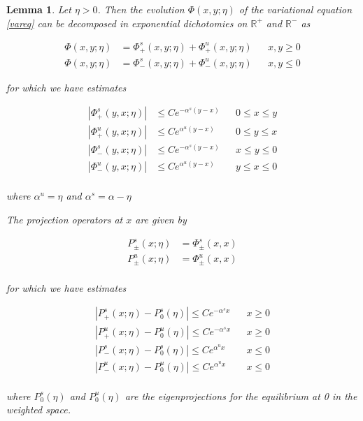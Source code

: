 \documentclass[12pt]{article}
\def\R{{\mathbb R}}
\newtheorem{lemma}{Lemma}
\begin{document}
\begin{lemma}\label{dichotomy}
Let $\eta > 0$. Then the evolution $\Phi(x, y; \eta)$ of the variational equation \eqref{vareq} can be decomposed in exponential dichotomies on $\R^+$ and $\R^-$ as

\begin{align*}
\Phi(x, y; \eta) &= \Phi^s_+(x, y; \eta) + \Phi^u_+(x, y; \eta) && x, y \geq 0 \\
\Phi(x, y; \eta) &= \Phi^s_-(x, y; \eta) + \Phi^u_-(x, y; \eta) && x, y \leq 0 
\end{align*}

for which we have estimates

\begin{align*}
|\Phi^s_+(y,x; \eta)| &\leq Ce^{-\alpha^s(y-x)} && 0 \leq x \leq y \\
|\Phi^u_+(y,x; \eta)| &\leq Ce^{\alpha^u(y-x)}  && 0 \leq y \leq x \\
|\Phi^s_-(y,x; \eta)| &\leq Ce^{-\alpha^s(y-x)} && x \leq y \leq 0 \\
|\Phi^u_-(y,x; \eta)| &\leq Ce^{\alpha^u(y-x)}  && y \leq x \leq 0 \\
\end{align*}

where $\alpha^u = \eta$ and $\alpha^s = \alpha - \eta$

The projection operators at $x$ are given by

\begin{align*}
P^s_\pm(x; \eta) &= \Phi^s_\pm(x,x)\\
P^u_\pm(x; \eta) &= \Phi^u_\pm(x,x)\\
\end{align*}

for which we have estimates

\begin{align*}
|P^s_+(x; \eta) - P_0^s(\eta)| \leq Ce^{-\alpha^s x} && x \geq 0 \\
|P^u_+(x; \eta) - P_0^u(\eta)| \leq Ce^{-\alpha^s x} && x \geq 0 \\
|P^s_-(x; \eta) - P_0^s(\eta)| \leq Ce^{\alpha^u x} && x \leq 0 \\
|P^u_-(x; \eta) - P_0^u(\eta)| \leq Ce^{\alpha^u x} && x \leq 0 \\
\end{align*}

where $P_0^s(\eta)$ and $P_0^u(\eta)$ are the eigenprojections for the equilibrium at 0 in the weighted space. 

\end{lemma}
\end{document}
